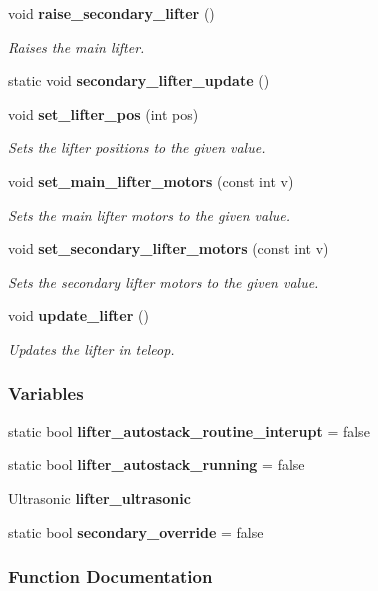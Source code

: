 \begin{DoxyCompactItemize}
void \textbf{ raise\+\_\+secondary\+\_\+lifter} ()
\begin{DoxyCompactList}\small\item\em Raises the main lifter. \end{DoxyCompactList}\item 
static void \textbf{ secondary\+\_\+lifter\+\_\+update} ()
\item 
void \textbf{ set\+\_\+lifter\+\_\+pos} (int pos)
\begin{DoxyCompactList}\small\item\em Sets the lifter positions to the given value. \end{DoxyCompactList}\item 
void \textbf{ set\+\_\+main\+\_\+lifter\+\_\+motors} (const int v)
\begin{DoxyCompactList}\small\item\em Sets the main lifter motors to the given value. \end{DoxyCompactList}\item 
void \textbf{ set\+\_\+secondary\+\_\+lifter\+\_\+motors} (const int v)
\begin{DoxyCompactList}\small\item\em Sets the secondary lifter motors to the given value. \end{DoxyCompactList}\item 
void \textbf{ update\+\_\+lifter} ()
\begin{DoxyCompactList}\small\item\em Updates the lifter in teleop. \end{DoxyCompactList}\end{DoxyCompactItemize}
\subsubsection*{Variables}
\begin{DoxyCompactItemize}
\item 
static bool \textbf{ lifter\+\_\+autostack\+\_\+routine\+\_\+interupt} = false
\item 
static bool \textbf{ lifter\+\_\+autostack\+\_\+running} = false
\item 
Ultrasonic \textbf{ lifter\+\_\+ultrasonic}
\item 
static bool \textbf{ secondary\+\_\+override} = false
\end{DoxyCompactItemize}


\subsubsection{Function Documentation}
\mbox{\label{a00107_a453a3fb02960a7b90435e942bbe90d7a}} 
